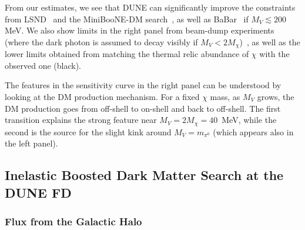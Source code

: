  From our estimates, we see that DUNE can significantly improve the constraints from LSND~\cite{deNiverville:2018dbu} and the MiniBooNE-DM search~\cite{Aguilar-Arevalo:2018wea}, as well as BaBar~\cite{Lees:2017lec} if $M_V \lesssim 200$ MeV. We also show limits in the right panel from beam-dump experiments (where the dark photon is assumed to decay visibly if $M_V < 2 M_\chi$)~\cite{Davier:1989wz,Batley:2015lha,Bjorken:1988as,Riordan:1987aw,Bjorken:2009mm,Bross:1989mp}, as well as the lower limits obtained from matching the thermal relic abundance of $\chi$ with the observed one (black).

The features in the sensitivity curve in the right panel can be understood by looking at the DM production mechanism.
For a fixed $\chi$ mass, as $M_V$ grows, the DM production goes from off-shell to on-shell and back to off-shell. The first transition explains the strong feature near $M_V=2M_\chi = 40$~MeV, while the second is the source for the slight kink around $M_V=m_{\pi^0}$ (which appears also in the left panel).





\subsection{Inelastic Boosted Dark Matter Search at the DUNE FD 
\label{sec:FD}}

\subsubsection{ Flux from the Galactic Halo \label{sec:flux}}

